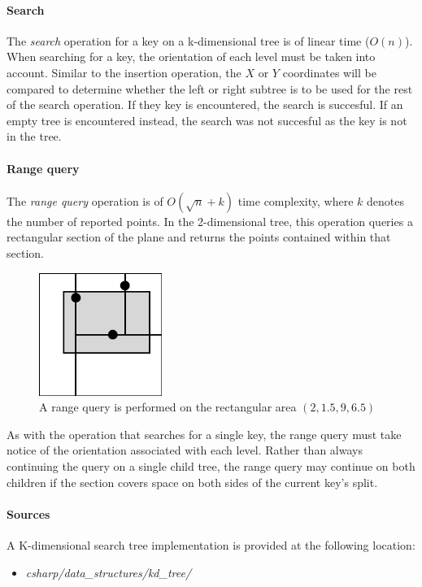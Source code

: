 \documentclass{article}
\begin{document}
\paragraph{Search}
The {\em search} operation for a key on a k-dimensional tree is of linear time (\(O(n)\)).
When searching for a key, the orientation of each level must be taken into account.
Similar to the insertion operation, the \(X\) or \(Y\) coordinates will be compared to determine
whether the left or right subtree is to be used for the rest of the search operation.
If they key is encountered, the search is succesful. If an empty tree is encountered instead,
the search was not succesful as the key is not in the tree.

\paragraph{Range query}
The {\em range query} operation is of \(O(\sqrt{n} + k)\) time complexity, where \(k\) denotes the number of
reported points. In the 2-dimensional tree, this operation queries a rectangular section of the plane and
returns the points contained within that section.

\begin{figure}[H]
  \centering
  \includegraphics[width=4cm]{2d_tree_3}
  \caption{A range query is performed on the rectangular area \((2, 1.5, 9, 6.5)\)}
\end{figure}

As with the operation that searches for a single key, the range query must take notice of the orientation
associated with each level. Rather than always continuing the query on a single child tree,
the range query may continue on both children if the section covers space on both sides of the current key's split.

\paragraph{Sources}
A K-dimensional search tree implementation is provided at the following location:
\begin{itemize}
\item{{\em csharp/data\_structures/kd\_tree/}}
\end{itemize}
\end{document}
